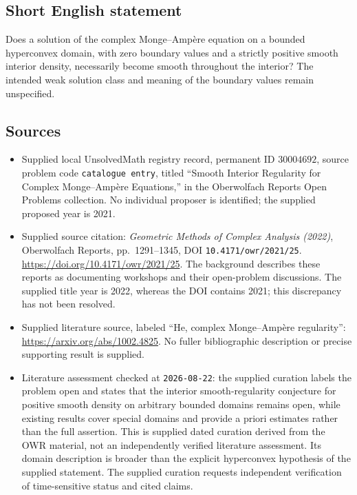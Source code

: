 \documentclass[11pt]{article}
\begin{document}
\subsection{Short English statement}
Does a solution of the complex Monge--Amp\`ere equation on a bounded hyperconvex domain, with zero boundary values and a strictly positive smooth interior density, necessarily become smooth throughout the interior? The intended weak solution class and meaning of the boundary values remain unspecified.
\subsection{Sources}
\begin{itemize}
\item Supplied local UnsolvedMath registry record, permanent ID \(30004692\), source problem code \texttt{catalogue entry}, titled ``Smooth Interior Regularity for Complex Monge--Amp\`ere Equations,'' in the Oberwolfach Reports Open Problems collection. No individual proposer is identified; the supplied proposed year is 2021.
\item Supplied source citation: \emph{Geometric Methods of Complex Analysis (2022)}, Oberwolfach Reports, pp.~1291--1345, DOI \texttt{10.4171/owr/2021/25}. \url{https://doi.org/10.4171/owr/2021/25}. The background describes these reports as documenting workshops and their open-problem discussions. The supplied title year is 2022, whereas the DOI contains 2021; this discrepancy has not been resolved.
\item Supplied literature source, labeled ``He, complex Monge--Amp\`ere regularity'': \url{https://arxiv.org/abs/1002.4825}. No fuller bibliographic description or precise supporting result is supplied.
\item Literature assessment checked at \texttt{2026-08-22}: the supplied curation labels the problem open and states that the interior smooth-regularity conjecture for positive smooth density on arbitrary bounded domains remains open, while existing results cover special domains and provide a priori estimates rather than the full assertion. This is supplied dated curation derived from the OWR material, not an independently verified literature assessment. Its domain description is broader than the explicit hyperconvex hypothesis of the supplied statement. The supplied curation requests independent verification of time-sensitive status and cited claims.
\end{itemize}
\end{document}

